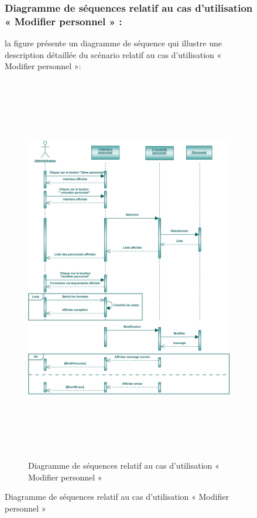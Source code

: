 \documentclass[12 pt]{report}
\begin{document}
\begin{figure}[h]
\begin{center}
\subsubsection{Diagramme de séquences relatif au cas d’utilisation « Modifier personnel » :}
la figure   présente un diagramme de séquence qui illustre une description détaillée du scénario relatif au cas d’utilisation « Modifier personnel »: 
{\begin{figure}[h]
 \begin{center}
\includegraphics[width= 18 cm ,height=  17cm]{sec_modif_per.PNG}
\caption{Diagramme de séquences relatif au cas d’utilisation « Modifier personnel  »}

\end{center}
\end{figure}}
\newpage

\end{center}
\end{figure}
\end{document}
